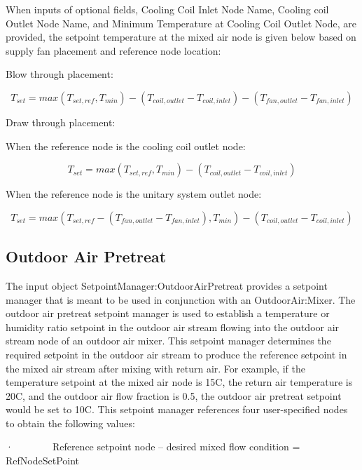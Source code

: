 When inputs of optional fields, Cooling Coil Inlet Node Name, Cooling coil Outlet Node Name, and Minimum Temperature at Cooling Coil Outlet Node, are provided, the setpoint temperature at the mixed air node is given below based on supply fan placement and reference node location:

Blow through placement:

\begin{equation}
{T_{set}} = max(T_{set,ref}, T_{min}) - ({T_{coil,outlet}} - {T_{coil,inlet}}) - ({T_{fan,outlet}} - {T_{fan,inlet}})
\end{equation}

Draw through placement:

When the reference node is the cooling coil outlet node:

\begin{equation}
{T_{set}} = max(T_{set,ref}, T_{min}) - ({T_{coil,outlet}} - {T_{coil,inlet}})
\end{equation}

When the reference node is the unitary system outlet node:

\begin{equation}
{T_{set}} = max(T_{set,ref} - ({T_{fan,outlet}} - {T_{fan,inlet}}), T_{min}) - ({T_{coil,outlet}} - {T_{coil,inlet}})
\end{equation}

\subsection{Outdoor Air Pretreat}\label{outdoor-air-pretreat}

The input object SetpointManager:OutdoorAirPretreat provides a setpoint manager that is meant to be used in conjunction with an OutdoorAir:Mixer. The outdoor air pretreat setpoint manager is used to establish a temperature or humidity ratio setpoint in the outdoor air stream flowing into the outdoor air stream node of an outdoor air mixer. This setpoint manager determines the required setpoint in the outdoor air stream to produce the reference setpoint in the mixed air stream after mixing with return air. For example, if the temperature setpoint at the mixed air node is 15C, the return air temperature is 20C, and the outdoor air flow fraction is 0.5, the outdoor air pretreat setpoint would be set to 10C. This setpoint manager references four user-specified nodes to obtain the following values:

·~~~~~~~~Reference setpoint node -- desired mixed flow condition = RefNodeSetPoint

